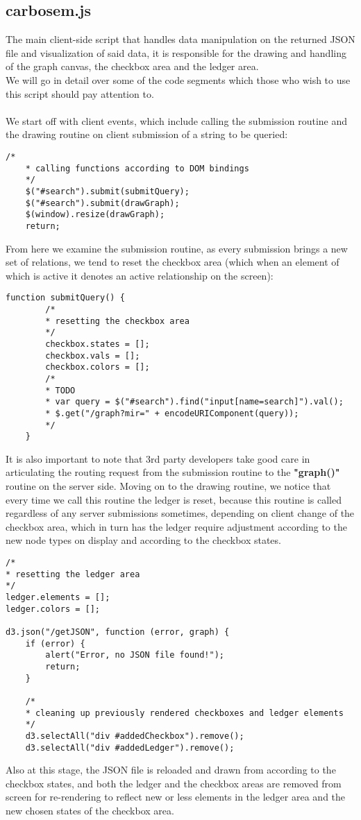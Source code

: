 \documentclass[12pt]{report}
\begin{document}
\subsection{carbosem.js}
The main client-side script that handles data manipulation on the returned JSON file and visualization of said data, it is responsible for the drawing and handling of the graph canvas, the checkbox area and the ledger area.\\
We will go in detail over some of the code segments which those who wish to use this script should pay attention to.\\\\
We start off with client events, which include calling the submission routine and the drawing routine on client submission of a string to be queried:
\begin{lstlisting}[style=python]
    /*
    * calling functions according to DOM bindings
    */
    $("#search").submit(submitQuery);
    $("#search").submit(drawGraph);
    $(window).resize(drawGraph);
    return;
\end{lstlisting}
From here we examine the submission routine, as every submission brings a new set of relations, we tend to reset the checkbox area (which when an element of which is active it denotes an active relationship on the screen):
\begin{lstlisting}[style=python]
    function submitQuery() {
    	/*
    	* resetting the checkbox area
    	*/
    	checkbox.states = [];
    	checkbox.vals = [];
    	checkbox.colors = [];
    	/*
    	* TODO
    	* var query = $("#search").find("input[name=search]").val();
    	* $.get("/graph?mir=" + encodeURIComponent(query));
    	*/
    }
\end{lstlisting}
It is also important to note that 3rd party developers take good care in articulating the routing request from the submission routine to the \textbf{"graph()"} routine on the server side.
\newpage
Moving on to the drawing routine, we notice that every time we call this routine the ledger is reset, because this routine is called regardless of any server submissions sometimes, depending on client change of the checkbox area, which in turn has the ledger require adjustment according to the new node types on display and according to the checkbox states.\\
\begin{lstlisting}[style=python]
/*
* resetting the ledger area
*/
ledger.elements = [];
ledger.colors = [];

d3.json("/getJSON", function (error, graph) {
	if (error) {
		alert("Error, no JSON file found!");
		return;
	}
	
	/*
	* cleaning up previously rendered checkboxes and ledger elements
	*/
	d3.selectAll("div #addedCheckbox").remove();
	d3.selectAll("div #addedLedger").remove();
\end{lstlisting}
Also at this stage, the JSON file is reloaded and drawn from according to the checkbox states, and both the ledger and the checkbox areas are removed from screen for re-rendering to reflect new or less elements in the ledger area and the new chosen states of the checkbox area.\\\\
\end{document}

